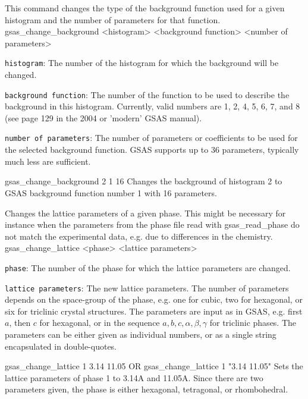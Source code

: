 {
This command changes the type of the background function used for a given histogram and the number of parameters for that function.
}{
gsas\_change\_background <histogram> <background function> <number of parameters>
}{
\item \texttt{histogram}: The number of the histogram for which the background will be changed.
\item \texttt{background function}: The number of the function to be used to describe the background in this histogram. Currently, valid numbers are 1, 2, 4, 5, 6, 7, and 8 (see page 129 in the 2004 or 'modern' GSAS manual).
\item \texttt{number of parameters}: The number of parameters or coefficients to be used for the selected background function. GSAS supports up to 36 parameters, typically much less are sufficient.
}{
gsas\_change\_background 2 1 16
}{
Changes the background of histogram 2 to GSAS background function number 1 with 16 parameters.
}

{
Changes the lattice parameters of a given phase. This might be necessary for instance when the parameters from the phase file read with gsas\_read\_phase do not match the experimental data, e.g. due to differences in the chemistry.
}{
gsas\_change\_lattice <phase> <lattice parameters>
}{
\item \texttt{phase}: The number of the phase for which the lattice parameters are changed.
\item \texttt{lattice parameters}: The new lattice parameters. The number of parameters depends on the space-group of the phase, e.g. one for cubic, two for hexagonal, or six for triclinic crystal structures. The parameters are input as in GSAS, e.g. first $a$, then $c$ for hexagonal, or in the sequence $a, b, c, \alpha, \beta, \gamma$ for triclinic phases. The parameters can be either given as individual numbers, or as a single string encapsulated in double-quotes.
}{
gsas\_change\_lattice 1 3.14 11.05 OR
gsas\_change\_lattice 1 "3.14 11.05"
}{
Sets the lattice parameters of phase 1 to 3.14A and 11.05A. Since there are two parameters given, the phase is either hexagonal, tetragonal, or rhombohedral.
}

